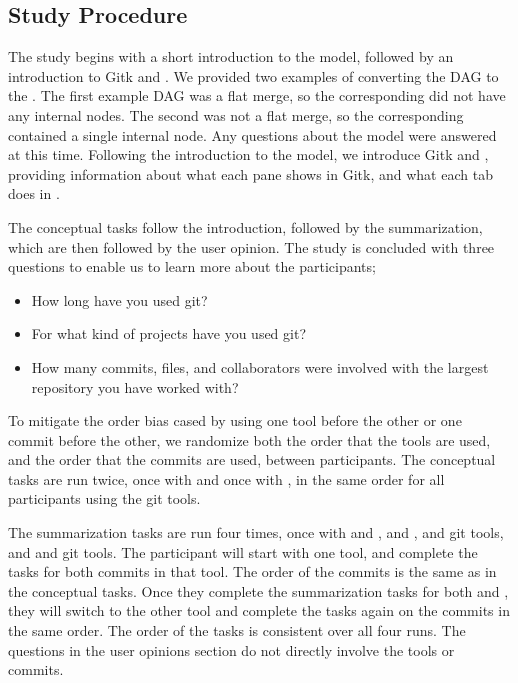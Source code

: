 \subsection{Study Procedure}
\label{sub:study_procedure}

The study begins with a short introduction to the \mt model, followed by
an introduction to Gitk and \tool. We provided two examples of
converting the DAG to the \mt. The first example DAG was a flat merge,
so the corresponding \mt did not have any internal nodes. The
second was not a flat merge, so the corresponding \mt contained a
single internal node. Any questions about the model were answered at
this time. Following the introduction to the \mt model, we introduce
Gitk and \tool, providing information about what each pane shows in
Gitk, and what each tab does in \tool.

The conceptual tasks follow the introduction, followed by the
summarization, which are then followed by the user opinion. The study is
concluded with three questions to enable us to learn more about the
participants;

\begin{itemize}
  \item How long have you used git?
  \item For what kind of projects have you used git?
  \item How many commits, files, and collaborators were involved with
    the largest repository you have worked with?
\end{itemize}

To mitigate the order bias cased by using one tool before the other or
one commit before the other, we randomize both the order that the tools
are used, and the order that the commits are used, between participants.
The conceptual tasks are run twice, once with \comA and once with \comB,
in the same order for all participants using the git tools.

 The summarization tasks are run
four times, once with \comA and \tool, \comB and \tool, \comA and git
tools, and \comB and git tools. The participant will start with one
tool, and complete the tasks for both commits in that tool. The order of
the commits is the same as in the conceptual tasks. Once they complete
the summarization tasks for both \comA and \comB, they will switch to
the other tool and complete the tasks again on the commits in the same
order. The order of the tasks is consistent over all four runs. The
questions in the user opinions section do not directly involve the tools
or commits.

